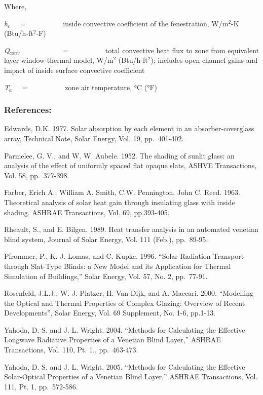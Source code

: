 Where,

\emph{h\(_{c}\)~~ = ~~~~~~~~~} inside convective coefficient of the fenestration, W/m\(^{2}\)-K (Btu/h-ft\(^{2}\)-F)

\emph{Q\(_{conv}\)~~~~~~~~~~~ = ~~~~~~~~~} total convective heat flux to zone from equivalent layer window thermal model, W/m\(^{2}\) (Btu/h-ft\(^{2}\)); includes open-channel gains and impact of inside surface convective coefficient

\emph{T\(_{a}\)~~ = ~~~~~~~~~} zone air temperature, °C (°F)

\subsubsection{References:}\label{references-2-009}

Edwards, D.K. 1977. Solar absorption by each element in an absorber-coverglass array, Technical Note, Solar Energy, Vol. 19, pp.~401-402.

Parmelee, G. V., and W. W. Aubele. 1952. The shading of sunlit glass: an analysis of the effect of uniformly spaced flat opaque slats, ASHVE Transactions, Vol. 58, pp.~377-398.

Farber, Erich A.; William A. Smith, C.W. Pennington, John C. Reed. 1963. Theoretical analysis of solar heat gain through insulating glass with inside shading. ASHRAE Transactions, Vol. 69, pp.393-405.

Rheault, S., and E. Bilgen. 1989. Heat transfer analysis in an automated venetian blind system, Journal of Solar Energy, Vol. 111 (Feb.), pp.~89-95.

Pfrommer, P., K. J. Lomas, and C. Kupke. 1996. ``Solar Radiation Transport through Slat-Type Blinds: a New Model and its Application for Thermal Simulation of Buildings,'' Solar Energy, Vol. 57, No. 2, pp.~77-91.

Rosenfeld, J.L.J., W. J. Platzer, H. Van Dijk, and A. Maccari. 2000. ``Modelling the Optical and Thermal Properties of Complex Glazing: Overview of Recent Developments'', Solar Energy, Vol. 69 Supplement, No. 1-6, pp.1-13.

Yahoda, D. S. and J. L. Wright. 2004. ``Methods for Calculating the Effective Longwave Radiative Properties of a Venetian Blind Layer,'' ASHRAE Transactions, Vol. 110, Pt. 1., pp.~463-473.

Yahoda, D. S. and J. L. Wright. 2005. ``Methods for Calculating the Effective Solar-Optical Properties of a Venetian Blind Layer,'' ASHRAE Transactions, Vol. 111, Pt. 1, pp.~572-586.

